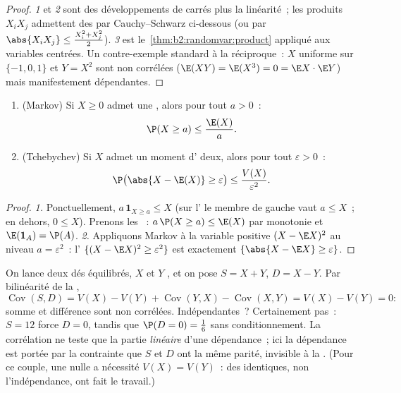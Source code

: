 \begin{proof}
\emph{1} et \emph{2} sont des développements de carrés plus la
linéarité~; les produits $X_iX_j$ admettent des  par
Cauchy--Schwarz ci-dessous (ou par $\abs{X_iX_j} \leq \frac{X_i^2 + X_j^2}{2}$). \emph{3} est
le~\cref{thm:b2:randomvar:product} appliqué aux variables centrées.
Un contre-exemple standard à la réciproque~: $X$ uniforme
sur $\{-1, 0, 1\}$ et $Y = X^2$ sont non corrélées
($\E(XY) = \E(X^3) = 0 = \E X \cdot \E Y$) mais manifestement dépendantes.
\end{proof}

\begin{theorem}\label{thm:b2:randomvar:markov}
\leavevmode
\begin{enumerate}
\item (Markov) Si $X \geq 0$ admet une , alors pour tout $a
> 0$~:
\[
\P(X \geq a) \leq \frac{\E(X)}{a} .
\]
\item (Tchebychev) Si $X$ admet un moment d' deux, alors pour tout
$\varepsilon > 0$~:
\[
\P\bigl(\abs{X - \E(X)} \geq \varepsilon\bigr)
\leq \frac{V(X)}{\varepsilon^2} .
\]
\end{enumerate}
\end{theorem}

\begin{proof}
\emph{1.} Ponctuellement, $a\,\mathbf{1}_{X \geq a} \leq X$ (sur
l' le membre de gauche vaut $a \leq X$~; en dehors, $0 \leq X$). Prenons
les ~: $a\,\P(X \geq a) \leq \E(X)$ par monotonie et
$\E(\mathbf{1}_A) = \P(A)$.
\emph{2.} Appliquons Markov à la variable positive $(X - \E
X)^2$ au niveau $a = \varepsilon^2$~: l' $\{(X - \E X)^2
\geq \varepsilon^2\}$ est exactement $\{\abs{X - \E X} \geq
\varepsilon\}$.
\end{proof}

\begin{example}\label{ex:b2:randomvar:sumdiff}
On lance deux dés équilibrés, $X$ et $Y$ , et on pose $S = X +
Y$, $D = X - Y$. Par bilinéarité de la ,
\[
\operatorname{Cov}(S, D) = V(X) - V(Y) +
\operatorname{Cov}(Y, X) - \operatorname{Cov}(X, Y) = V(X) -
V(Y) = 0 :
\]
somme et différence sont non corrélées. Indépendantes~? Certainement
pas~: $S = 12$ force $D = 0$, tandis que $\P(D = 0) =
\frac16$ sans conditionnement. La corrélation ne teste que la partie
\emph{linéaire} d'une dépendance~; ici la dépendance est
portée par la contrainte que $S$ et $D$ ont la même
parité, invisible à la . (Pour ce couple, une 
nulle a nécessité $V(X) = V(Y)$~: des  identiques,
non l'indépendance, ont fait le travail.)
\end{example}

